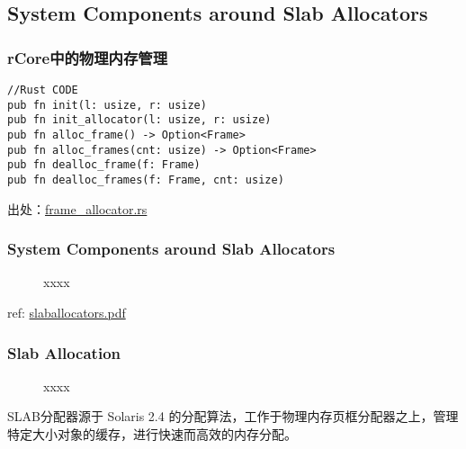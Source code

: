 \subsection{System Components around Slab Allocators} %
\begin{frame}[fragile]   
    \frametitle{rCore中的物理内存管理}

\begin{block}{}
\begin{verbatim}
//Rust CODE
pub fn init(l: usize, r: usize)
pub fn init_allocator(l: usize, r: usize)
pub fn alloc_frame() -> Option<Frame>
pub fn alloc_frames(cnt: usize) -> Option<Frame>
pub fn dealloc_frame(f: Frame)
pub fn dealloc_frames(f: Frame, cnt: usize) 
\end{verbatim}
\end{block}

出处：\href{https://github.com/rcore-os/rCore_tutorial/blob/ch4-pa2/os/src/memory/frame_allocator.rs}{frame_allocator.rs}

\end{frame}
\begin{frame}[plain,t]    
    \frametitle{System Components around Slab Allocators}
    \begin{figure}
        \centering
        \caption{xxxx}
    \end{figure}

    ref: \href{https://events.static.linuxfound.org/sites/events/files/slides/slaballocators.pdf}{slaballocators.pdf}

\end{frame}
\begin{frame}[plain,t]    
    \frametitle{Slab Allocation}
    \begin{figure}
        \centering
        \caption{xxxx}
    \end{figure}

    SLAB分配器源于 Solaris 2.4 的分配算法，工作于物理内存页框分配器之上，管理特定大小对象的缓存，进行快速而高效的内存分配。

\end{frame}
